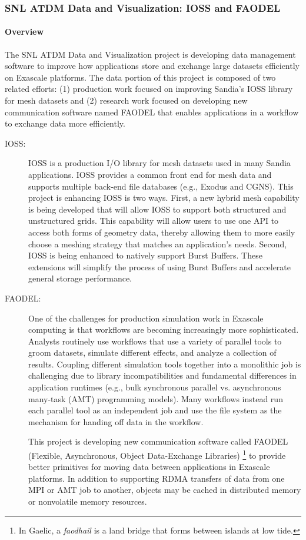 \subsubsection{SNL ATDM Data and Visualization: IOSS and FAODEL} 

\paragraph{Overview} 
The SNL ATDM Data and Visualization project is developing data management software to improve how applications store and exchange large datasets efficiently on Exascale platforms. The data portion of this project is composed of two related efforts: (1) production work focused on improving Sandia's IOSS library for mesh datasets and (2) research work focused on developing new communication software named FAODEL that enables applications in a workflow to exchange data more efficiently.

\begin{description}
\item[IOSS:] IOSS is a production I/O library for mesh datasets used in many Sandia applications. IOSS provides a common front end for mesh data and supports multiple back-end file databases (e.g., Exodus and CGNS). This project is enhancing IOSS is two ways. First, a new hybrid mesh capability is being developed that will allow IOSS to support both structured and unstructured grids. This capability will allow users to use one API to access both forms of geometry data, thereby allowing them to more easily choose a meshing strategy that matches an application's needs. Second, IOSS is being enhanced to natively support Burst Buffers. These extensions will simplify the process of using Burst Buffers and accelerate general storage performance.


\item[FAODEL:] 
One of the challenges for production simulation work in Exascale computing is that workflows are becoming increasingly more sophisticated. Analysts routinely use workflows that use a variety of parallel tools to groom datasets, simulate different effects, and analyze a collection of results. Coupling different simulation tools together into a monolithic job is challenging due to library incompatibilities and fundamental differences in application runtimes (e.g., bulk synchronous parallel vs. asynchronous many-task (AMT) programming models). Many workflows instead run each parallel tool as an independent job and use the file system as the mechanism for handing off data in the workflow.

This project is developing new communication software called FAODEL (Flexible, Asynchronous, Object Data-Exchange Libraries) \footnote{In Gaelic, a \emph{faodhail} is a land bridge that forms between islands at low tide.} to provide better primitives for moving data between applications in Exascale platforms. In addition to supporting RDMA transfers of data from one MPI or AMT job to another, objects may be cached in distributed memory or nonvolatile memory resources.
\end{description}


